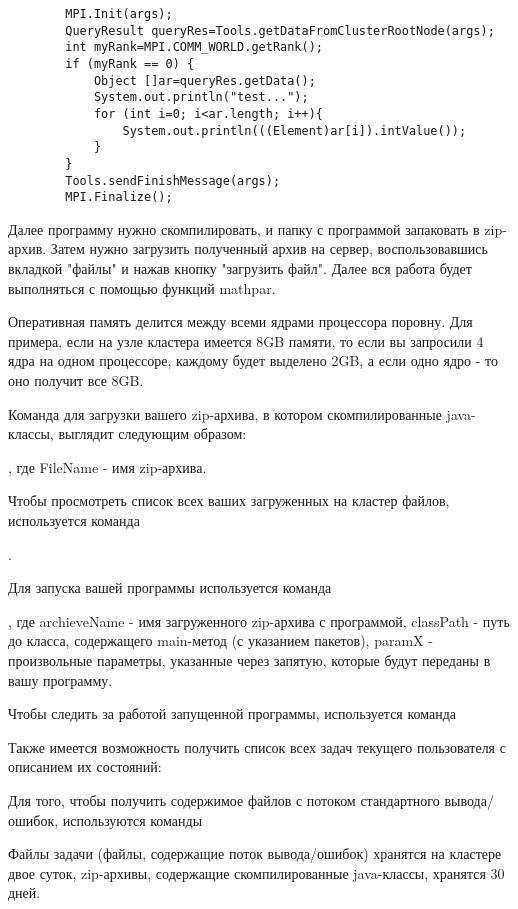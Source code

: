 \begin{verbatim}
        MPI.Init(args);
        QueryResult queryRes=Tools.getDataFromClusterRootNode(args);
        int myRank=MPI.COMM_WORLD.getRank();
        if (myRank == 0) {
            Object []ar=queryRes.getData();
            System.out.println("test...");           
            for (int i=0; i<ar.length; i++){
                System.out.println(((Element)ar[i]).intValue());
            }            
        }
        Tools.sendFinishMessage(args);
        MPI.Finalize();
\end{verbatim}


  Далее программу нужно скомпилировать, и папку с программой запаковать в zip-архив.
  Затем нужно загрузить полученный архив на сервер, воспользовавшись вкладкой "файлы" и нажав кнопку "загрузить файл".
  Далее вся работа будет выполняться с помощью функций mathpar. 

Оперативная память делится между всеми ядрами процессора поровну. Для примера, если на узле кластера имеется 8GB памяти,
то если вы запросили 4 ядра на одном процессоре, каждому будет выделено 2GB, а если одно ядро - то оно получит все 8GB.

Команда для загрузки вашего zip-архива, в котором скомпилированные java-классы,
выглядит следующим образом:

 , где FileName - имя zip-архива.

Чтобы просмотреть список всех ваших загруженных на кластер файлов, используется команда

 .


Для запуска вашей программы используется команда

,
где archieveName - имя загруженного zip-архива с программой, classPath - путь до класса, содержащего main-метод (с указанием пакетов),
paramX - произвольные параметры, указанные через запятую, которые будут переданы в вашу программу.

Чтобы следить за работой запущенной программы, используется команда 


Также имеется возможность получить список всех задач текущего пользователя с описанием их состояний:


Для того, чтобы получить содержимое файлов с потоком стандартного вывода/ошибок, используются команды



Файлы задачи (файлы, содержащие поток вывода/ошибок) хранятся на кластере двое суток,
zip-архивы, содержащие скомпилированные java-классы, хранятся 30 дней.

